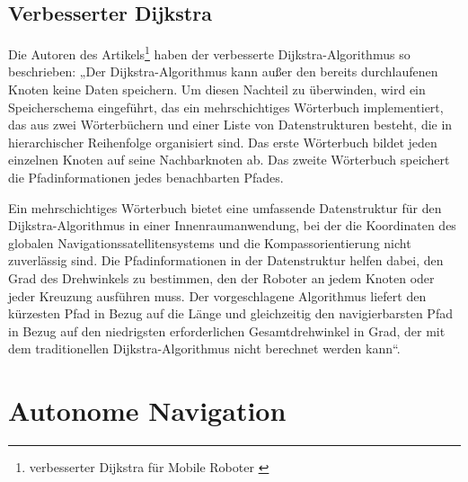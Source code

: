 \subsection{Verbesserter Dijkstra }
Die Autoren des Artikels\footnote{ verbesserter Dijkstra für Mobile Roboter \cite{Karur2021}} haben der verbesserte Dijkstra-Algorithmus so beschrieben:
„Der Dijkstra-Algorithmus kann außer den bereits durchlaufenen Knoten keine Daten speichern. Um diesen Nachteil zu überwinden, wird ein Speicherschema eingeführt, das ein mehrschichtiges Wörterbuch implementiert, das aus zwei Wörterbüchern und einer Liste von Datenstrukturen besteht, die in hierarchischer Reihenfolge organisiert sind. Das erste Wörterbuch bildet jeden einzelnen Knoten auf seine Nachbarknoten ab. Das zweite Wörterbuch speichert die Pfadinformationen jedes benachbarten Pfades.
\newline
\newline

Ein mehrschichtiges Wörterbuch bietet eine umfassende Datenstruktur für den Dijkstra-Algorithmus in einer Innenraumanwendung, bei der die Koordinaten des globalen Navigationssatellitensystems und die Kompassorientierung nicht zuverlässig sind. Die Pfadinformationen in der Datenstruktur helfen dabei, den Grad des Drehwinkels zu bestimmen, den der Roboter an jedem Knoten oder jeder Kreuzung ausführen muss. Der vorgeschlagene Algorithmus liefert den kürzesten Pfad in Bezug auf die Länge und gleichzeitig den navigierbarsten Pfad in Bezug auf den niedrigsten erforderlichen Gesamtdrehwinkel in Grad, der mit dem traditionellen Dijkstra-Algorithmus nicht berechnet werden kann“.

\section{Autonome Navigation}
\label{Autonome Navigation}

